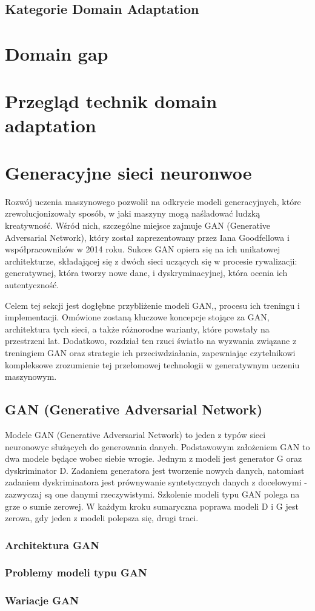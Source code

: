         \subsection{Kategorie Domain Adaptation}
        
    \pagebreak 
    \section{Domain gap}
    \pagebreak
    \section{Przegląd technik domain adaptation}
    \pagebreak
    \section{Generacyjne sieci neuronwoe}
        Rozwój uczenia maszynowego pozwolił na odkrycie modeli generacyjnych, które zrewolucjonizowały sposób, w jaki maszyny mogą naśladować ludzką kreatywność. Wśród nich, szczególne miejsce zajmuje GAN (Generative Adversarial Network), który został zaprezentowany przez  Iana Goodfellowa i współpracowników w 2014 roku\cite{goodfellow}. Sukces GAN opiera się na ich unikatowej architekturze, składającej się z dwóch sieci uczących się w procesie rywalizacji: generatywnej, która tworzy nowe dane, i dyskryminacyjnej, która ocenia ich autentyczność.\par
        Celem tej sekcji jest dogłębne przybliżenie modeli GAN,, procesu ich treningu i implementacji. Omówione zostaną kluczowe koncepcje stojące za GAN, architektura tych sieci, a także różnorodne warianty, które powstały na przestrzeni lat. Dodatkowo, rozdział ten rzuci światło na wyzwania związane z treningiem GAN oraz strategie ich przeciwdziałania, zapewniając czytelnikowi kompleksowe zrozumienie tej przełomowej technologii w generatywnym uczeniu maszynowym.
        \subsection{GAN (Generative Adversarial Network)}
            Modele GAN (Generative Adversarial Network) to jeden z typów sieci neuronowyc służących do generowania danych. Podstawowym założeniem GAN to dwa modele będące wobec siebie wrogie. Jednym z modeli jest generator G oraz dyskriminator D. Zadaniem generatora jest tworzenie nowych danych, natomiast zadaniem dyskriminatora jest prównywanie syntetycznych danych z docelowymi - zazwyczaj są one danymi rzeczywistymi. Szkolenie modeli typu GAN polega na grze o sumie zerowej\cite{gan-intro}. W każdym kroku sumaryczna poprawa modeli D i G jest zerowa, gdy jeden z modeli polepsza się, drugi traci. 
            \subsubsection{Architektura GAN}
            \subsubsection{Problemy modeli typu GAN}
            \subsubsection{Wariacje GAN}
    \pagebreak
